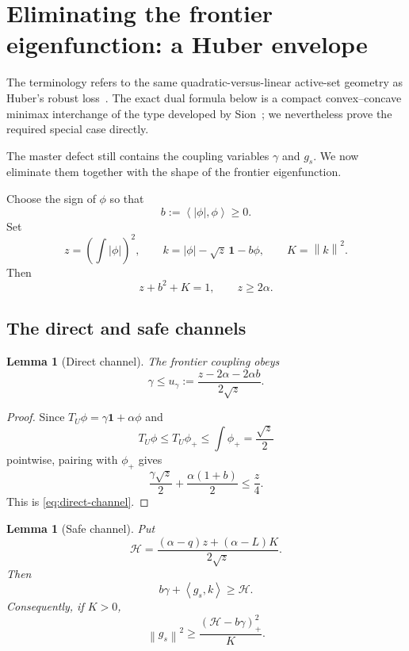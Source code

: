 \documentclass[11pt]{article}
\newtheorem{lemma}[theorem]{Lemma}
\newcommand{\one}{\mathbf 1}
\newcommand{\ip}[2]{\left\langle #1,#2\right\rangle}
\newcommand{\norm}[1]{\left\lVert #1\right\rVert}
\newcommand{\pos}[1]{\left(#1\right)_{+}}
\newcommand{\cH}{\mathcal H}
\begin{document}
\section{Eliminating the frontier eigenfunction: a Huber envelope}
\label{sec:huber}

The terminology refers to the same quadratic-versus-linear active-set
geometry as Huber's robust loss~\cite{Huber1964}.  The exact dual formula
below is a compact convex--concave minimax interchange of the type developed
by Sion~\cite{Sion1958}; we nevertheless prove the required special case
directly.

The master defect still contains the coupling variables \(\gamma\) and
\(g_s\).  We now eliminate them together with the shape of the frontier
eigenfunction.

Choose the sign of \(\phi\) so that
\[
       b:=\ip{|\phi|}{\phi}\ge0.
\]
Set
\begin{equation}\label{eq:shape-defs}
 z=\left(\int|\phi|\right)^2,
 \qquad
 k=|\phi|-\sqrt z\,\one-b\phi,
 \qquad
 K=\norm k^2.
\end{equation}
Then
\begin{equation}\label{eq:shape-budget}
       z+b^2+K=1,
       \qquad z\ge2\alpha.
\end{equation}

\subsection{The direct and safe channels}

\begin{lemma}[Direct channel]\label{lem:direct-channel}
The frontier coupling obeys
\begin{equation}\label{eq:direct-channel}
       \gamma\le u_\gamma:=
       \frac{z-2\alpha-2\alpha b}{2\sqrt z}.
\end{equation}
\end{lemma}

\begin{proof}
Since \(T_U\phi=\gamma\one+\alpha\phi\) and
\[
       T_U\phi\le T_U\phi_+\le\int\phi_+=\frac{\sqrt z}{2}
\]
pointwise, pairing with \(\phi_+\) gives
\[
       \frac{\gamma\sqrt z}{2}
       +\frac{\alpha(1+b)}{2}
       \le\frac z4.
\]
This is \eqref{eq:direct-channel}.
\end{proof}

\begin{lemma}[Safe channel]\label{lem:safe-channel}
Put
\begin{equation}\label{eq:H-shape}
       \cH=\frac{(\alpha-q)z+(\alpha-L)K}{2\sqrt z}.
\end{equation}
Then
\begin{equation}\label{eq:safe-channel}
       b\gamma+\ip{g_s}{k}\ge\cH.
\end{equation}
Consequently, if \(K>0\),
\begin{equation}\label{eq:gs-safe-lower}
       \norm{g_s}^2\ge
       \frac{\pos{\cH-b\gamma}^2}{K}.
\end{equation}
\end{lemma}
\end{document}
